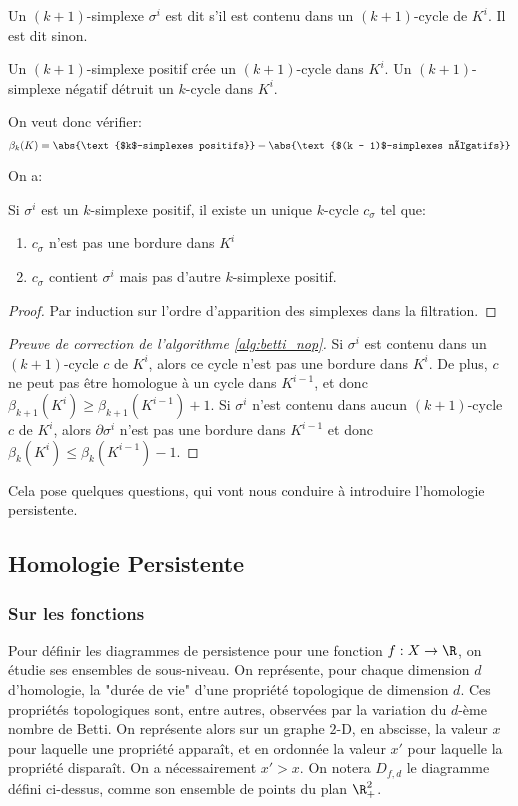 \begin{definition}
	Un $(k + 1)$-simplexe $\sigma^{i}$ est dit  s'il est contenu dans un $(k + 1)$-cycle de $K^{i}$.
	Il est dit  sinon.
\end{definition}
Un $(k + 1)$-simplexe positif crée un $(k + 1)$-cycle dans $K^{i}$.
Un $(k + 1)$-simplexe négatif détruit un $k$-cycle dans $K^{i}$.

On veut donc vérifier:
\begin{equation*}
	\beta_{k}(K) = \abs{\text{$k$-simplexes positifs}} - \abs{\text{$(k - 1)$-simplexes négatifs}}
\end{equation*}

On a:
\begin{lemme}
	\label{lem:filter_cycle}
	Si $\sigma^{i}$ est un $k$-simplexe positif, il existe un unique $k$-cycle $c_{\sigma}$ tel que:
	\begin{enumerate}
		\item $c_{\sigma}$ n'est pas une bordure dans $K^{i}$
		\item $c_{\sigma}$ contient $\sigma^{i}$ mais pas d'autre $k$-simplexe positif.
	\end{enumerate}
\end{lemme}
\begin{proof}
	Par induction sur l'ordre d'apparition des simplexes dans la filtration.
\end{proof}

\begin{proof}[Preuve de correction de l'algorithme \ref{alg:betti_nop}]
	Si $\sigma^{i}$ est contenu dans un $(k + 1)$-cycle $c$ de $K^{i}$, alors ce cycle n'est pas une bordure dans $K^{i}$.
	De plus, $c$ ne peut pas être homologue à un cycle dans $K^{i - 1}$, et donc $\beta_{k + 1}\left(K^{i}\right) \geq \beta_{k + 1}(K^{i - 1}) + 1$.
	Si $\sigma^{i}$ n'est contenu dans aucun $(k + 1)$-cycle $c$ de $K^{i}$, alors $\partial\sigma^{i}$ n'est pas une bordure dans $K^{i - 1}$ et donc $\beta_{k}(K^{i}) \leq \beta_{k}\left(K^{i - 1}\right) - 1$.
\end{proof}

Cela pose quelques questions, qui vont nous conduire à introduire l'homologie persistente.

\subsection{Homologie Persistente}
\subsubsection{Sur les fonctions}
Pour définir les diagrammes de persistence pour une fonction $f: X \to \R$, on étudie ses
ensembles de sous-niveau.
On représente, pour chaque dimension $d$ d'homologie, la "durée de vie" d'une propriété topologique de dimension $d$.
Ces propriétés topologiques sont, entre autres, observées par la variation du $d$-ème nombre de Betti.
On représente alors sur un graphe $2$-D, en abscisse, la valeur $x$ pour laquelle une propriété apparaît, et en ordonnée la valeur $x'$ pour laquelle la propriété disparaît.
On a nécessairement $x' > x$.
On notera $D_{f, d}$ le diagramme défini ci-dessus, comme son ensemble de points du plan $\R_{+}^{2}$.

